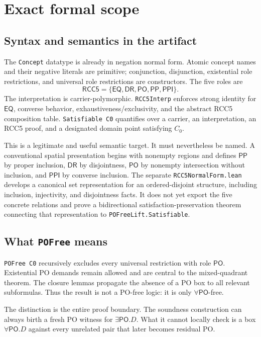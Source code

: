 \documentclass[11pt]{article}
\newcommand{\PP}{\mathsf{PP}}
\newcommand{\PPI}{\mathsf{PPI}}
\newcommand{\PO}{\mathsf{PO}}
\newcommand{\DR}{\mathsf{DR}}
\newcommand{\EQ}{\mathsf{EQ}}
\newcommand{\code}[1]{\texttt{#1}}
\begin{document}
\section{Exact formal scope}

\subsection{Syntax and semantics in the artifact}

The \code{Concept} datatype is already in negation normal form. Atomic concept names
and their negative literals are primitive; conjunction, disjunction, existential role
restrictions, and universal role restrictions are constructors. The five roles are
\[
  \mathsf{RCC5}=\{\EQ,\DR,\PO,\PP,\PPI\}.
\]
The interpretation is carrier-polymorphic. \code{RCC5Interp} enforces strong identity
for $\EQ$, converse behavior, exhaustiveness/exclusivity, and the abstract RCC5
composition table. \code{Satisfiable C0} quantifies over a carrier, an interpretation,
an RCC5 proof, and a designated domain point satisfying $C_0$.

This is a legitimate and useful semantic target. It must nevertheless be named. A
conventional spatial presentation begins with nonempty regions and defines $\PP$ by
proper inclusion, $\DR$ by disjointness, $\PO$ by nonempty intersection without
inclusion, and $\PPI$ by converse inclusion. The separate
\code{RCC5NormalForm.lean} develops a canonical set representation for an
ordered-disjoint structure, including inclusion, injectivity, and disjointness facts.
It does not yet export the five concrete relations and prove a bidirectional
satisfaction-preservation theorem connecting that representation to
\code{POFreeLift.Satisfiable}.

\subsection{What \code{POFree} means}

\code{POFree C0} recursively excludes every universal restriction with role $\PO$.
Existential PO demands remain allowed and are central to the mixed-quadrant theorem.
The closure lemmas propagate the absence of a PO box to all relevant subformulas.
Thus the result is not a PO-free logic: it is only $\forall\PO$-free.

The distinction is the entire proof boundary. The soundness construction can always
birth a fresh PO witness for $\exists\PO.D$. What it cannot locally check is a box
$\forall\PO.D$ against every unrelated pair that later becomes residual PO.
\end{document}
